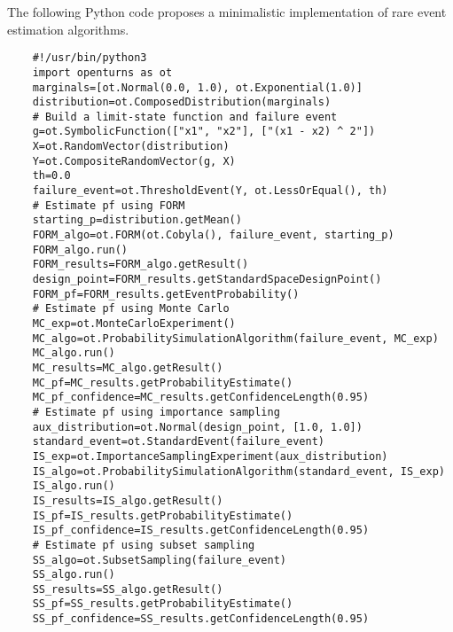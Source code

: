 \begin{otexample}
    The following Python code proposes a minimalistic \ot implementation of rare event estimation algorithms. 
    \lstset{style=mystyle, language=python}
%
\begin{lstlisting}
    #!/usr/bin/python3
    import openturns as ot
    marginals=[ot.Normal(0.0, 1.0), ot.Exponential(1.0)]
    distribution=ot.ComposedDistribution(marginals)
    # Build a limit-state function and failure event
    g=ot.SymbolicFunction(["x1", "x2"], ["(x1 - x2) ^ 2"])
    X=ot.RandomVector(distribution)
    Y=ot.CompositeRandomVector(g, X)
    th=0.0
    failure_event=ot.ThresholdEvent(Y, ot.LessOrEqual(), th)
    # Estimate pf using FORM
    starting_p=distribution.getMean()
    FORM_algo=ot.FORM(ot.Cobyla(), failure_event, starting_p)
    FORM_algo.run()
    FORM_results=FORM_algo.getResult()
    design_point=FORM_results.getStandardSpaceDesignPoint()
    FORM_pf=FORM_results.getEventProbability()
    # Estimate pf using Monte Carlo 
    MC_exp=ot.MonteCarloExperiment()
    MC_algo=ot.ProbabilitySimulationAlgorithm(failure_event, MC_exp)
    MC_algo.run()
    MC_results=MC_algo.getResult()
    MC_pf=MC_results.getProbabilityEstimate()
    MC_pf_confidence=MC_results.getConfidenceLength(0.95)
    # Estimate pf using importance sampling
    aux_distribution=ot.Normal(design_point, [1.0, 1.0])
    standard_event=ot.StandardEvent(failure_event)
    IS_exp=ot.ImportanceSamplingExperiment(aux_distribution)
    IS_algo=ot.ProbabilitySimulationAlgorithm(standard_event, IS_exp)
    IS_algo.run()
    IS_results=IS_algo.getResult()
    IS_pf=IS_results.getProbabilityEstimate()
    IS_pf_confidence=IS_results.getConfidenceLength(0.95)
    # Estimate pf using subset sampling
    SS_algo=ot.SubsetSampling(failure_event)
    SS_algo.run()
    SS_results=SS_algo.getResult()
    SS_pf=SS_results.getProbabilityEstimate()
    SS_pf_confidence=SS_results.getConfidenceLength(0.95)
\end{lstlisting}
%
\end{otexample}


